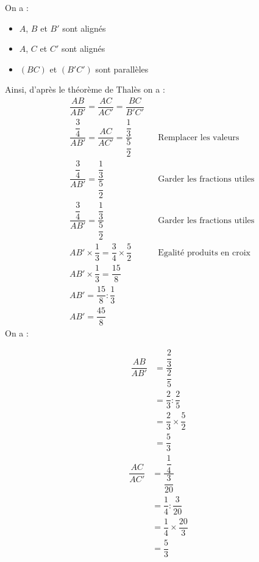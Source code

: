 \begin{multicols}{2}
    \exo{}{} On a :
    \begin{itemize}
      \item $A$, $B$ et $B'$ sont alignés
      \item $A$, $C$ et $C'$ sont alignés
      \item $(BC)$ et $(B'C')$ sont parallèles
    \end{itemize}
    Ainsi, d'après le théorème de Thalès on a :
    \begin{align*}
        &\dfrac{AB}{AB'}=\dfrac{AC}{AC'}=\dfrac{BC}{B'C'}&&\\
        &\dfrac{\dfrac{3}{4}}{AB'}=\dfrac{AC}{AC'}=\dfrac{\dfrac{1}{3}}{\dfrac{5}{2}}&&\text{Remplacer les valeurs}\\
        &\dfrac{\dfrac{3}{4}}{AB'}=\dfrac{\dfrac{1}{3}}{\dfrac{5}{2}} &&\text{Garder les fractions utiles}\\
        &\dfrac{\dfrac{3}{4}}{AB'}=\dfrac{\dfrac{1}{3}}{\dfrac{5}{2}} &&\text{Garder les fractions utiles}\\
        &AB'\times \dfrac{1}{3}=\dfrac{3}{4}\times \dfrac{5}{2}&&\text{Egalité produits en croix}\\
        &AB'\times \dfrac{1}{3}= \dfrac{15}{8}&&\\
        &AB'=\dfrac{15}{8}:\dfrac{1}{3}&&\\
        &AB'=\dfrac{45}{8}
    \end{align*}
    \exo{}{} On a : \vspace{-0.5em}
    \begin{multicols}{3}
        \noindent
        \begin{align*}
            \dfrac{AB}{AB'}&=\dfrac{\dfrac{2}{3}}{\dfrac{2}{5}}\\
            &=\dfrac{2}{3}:\dfrac{2}{5}\\
            &=\dfrac{2}{3}\times\dfrac{5}{2}\\
            &=\dfrac{5}{3}
        \end{align*}
        \begin{align*}
            \dfrac{AC}{AC'}&=\dfrac{\dfrac{1}{4}}{\dfrac{3}{20}}\\
            &=\dfrac{1}{4}:\dfrac{3}{20}\\
            &=\dfrac{1}{4}\times\dfrac{20}{3}\\
            &=\dfrac{5}{3}
        \end{align*}

\end{multicols}
\end{multicols}
